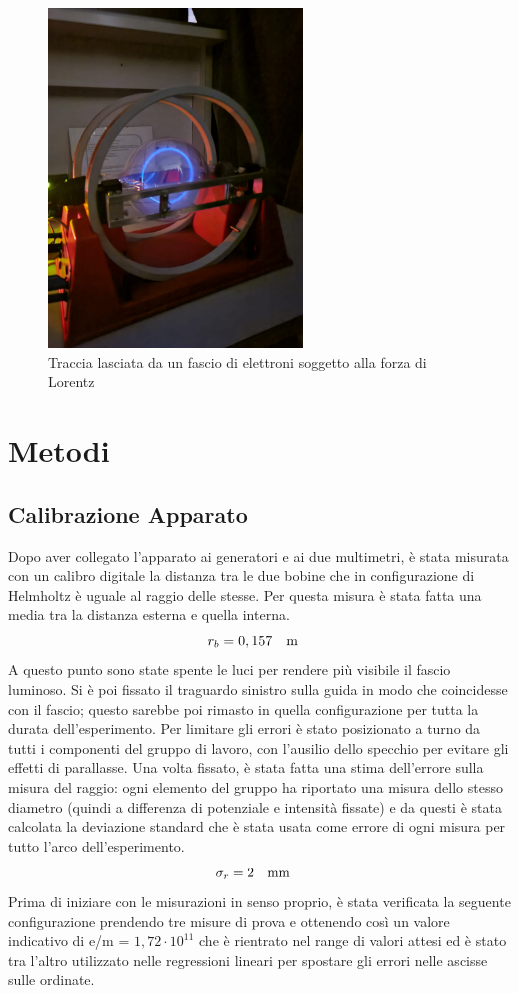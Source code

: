 \documentclass{article}
\begin{document}
\begin{figure}[h]
    \centering
    \includegraphics[scale=0.25,height= 9cm,width = 7 cm ]{../images/Apparato_sperimentale.jpeg}
    \caption{Traccia lasciata da un fascio di elettroni soggetto alla forza di Lorentz}
    \label{fig:Bella}
\end{figure}

\section{Metodi}
\subsection{Calibrazione Apparato} 
     Dopo aver collegato l'apparato ai generatori e ai due multimetri, è stata misurata con un calibro digitale la distanza tra le due bobine che in configurazione di Helmholtz è uguale al raggio delle stesse. Per questa misura è stata fatta una media tra la distanza esterna e quella interna. 
    \[ r_b = 0,157 \qq{m}\]
     A questo punto sono state spente le luci per rendere più visibile il fascio luminoso. Si è poi fissato il traguardo sinistro sulla guida in modo che coincidesse con il fascio; questo sarebbe poi rimasto in quella configurazione per tutta la durata dell'esperimento. Per limitare gli errori è stato posizionato a turno da tutti i componenti del gruppo di lavoro, con l'ausilio dello specchio per evitare gli effetti di parallasse. Una volta fissato, è stata fatta una stima dell'errore sulla misura del raggio: ogni elemento del gruppo ha riportato una misura dello stesso diametro (quindi a differenza di potenziale e intensità fissate) e da questi è stata calcolata la deviazione standard che è stata usata come errore di ogni misura per tutto l'arco dell'esperimento.
     \[\sigma_r = 2 \qq{mm}\]
     Prima di iniziare con le misurazioni in senso proprio, è stata verificata la seguente configurazione prendendo tre misure di prova e ottenendo così un valore indicativo di e/m = $1,72\cdot 10^{11}$ che è rientrato nel range di valori attesi ed è stato tra l'altro utilizzato nelle regressioni lineari per spostare gli errori nelle ascisse sulle ordinate. 
    
\end{document}

